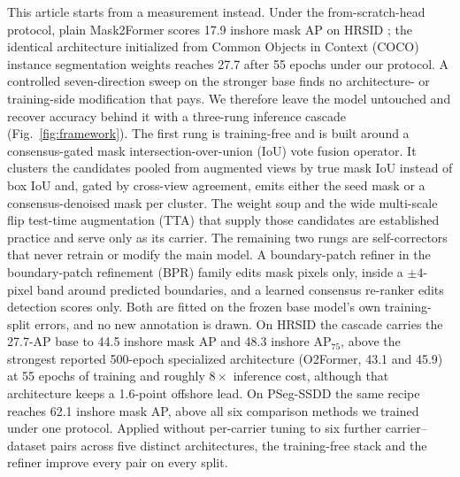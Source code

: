 This article starts from a measurement instead. Under the from-scratch-head protocol, plain Mask2Former \cite{mask2former2022} scores 17.9 inshore mask AP on HRSID \cite{o2former2025}; the identical architecture initialized from Common Objects in Context (COCO) instance segmentation weights reaches 27.7 after 55 epochs under our protocol. A controlled seven-direction sweep on the stronger base finds no architecture- or training-side modification that pays. We therefore leave the model untouched and recover accuracy behind it with a three-rung inference cascade (Fig.~\ref{fig:framework}). The first rung is training-free and is built around a consensus-gated mask intersection-over-union (IoU) vote fusion operator. It clusters the candidates pooled from augmented views by true mask IoU instead of box IoU and, gated by cross-view agreement, emits either the seed mask or a consensus-denoised mask per cluster. The weight soup \cite{modelsoups2022} and the wide multi-scale flip test-time augmentation (TTA) that supply those candidates are established practice and serve only as its carrier. The remaining two rungs are self-correctors that never retrain or modify the main model. A boundary-patch refiner in the boundary-patch refinement (BPR) family \cite{bpr2021} edits mask pixels only, inside a $\pm 4$-pixel band around predicted boundaries, and a learned consensus re-ranker edits detection scores only. Both are fitted on the frozen base model's own training-split errors, and no new annotation is drawn. On HRSID the cascade carries the 27.7-AP base to 44.5 inshore mask AP and 48.3 inshore AP$_{75}$, above the strongest reported 500-epoch specialized architecture (O2Former, 43.1 and 45.9) at 55 epochs of training and roughly $8\times$ inference cost, although that architecture keeps a 1.6-point offshore lead. On PSeg-SSDD the same recipe reaches 62.1 inshore mask AP, above all six comparison methods we trained under one protocol. Applied without per-carrier tuning to six further carrier--dataset pairs across five distinct architectures, the training-free stack and the refiner improve every pair on every split.

